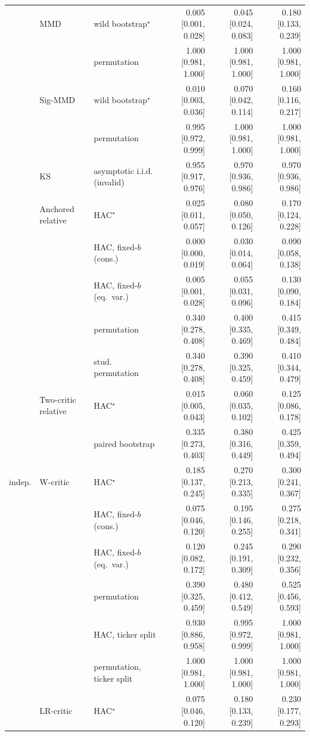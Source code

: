 \begin{tabular}{lllrrr}
 & MMD & wild bootstrap$^{\star}$ & 0.005 [0.001, 0.028] & 0.045 [0.024, 0.083] & 0.180 [0.133, 0.239] \\
 &  & permutation & 1.000 [0.981, 1.000] & 1.000 [0.981, 1.000] & 1.000 [0.981, 1.000] \\
 & Sig-MMD & wild bootstrap$^{\star}$ & 0.010 [0.003, 0.036] & 0.070 [0.042, 0.114] & 0.160 [0.116, 0.217] \\
 &  & permutation & 0.995 [0.972, 0.999] & 1.000 [0.981, 1.000] & 1.000 [0.981, 1.000] \\
 & KS & asymptotic i.i.d. (invalid) & 0.955 [0.917, 0.976] & 0.970 [0.936, 0.986] & 0.970 [0.936, 0.986] \\
 & Anchored relative & HAC$^{\star}$ & 0.025 [0.011, 0.057] & 0.080 [0.050, 0.126] & 0.170 [0.124, 0.228] \\
 &  & HAC, fixed-$b$ (cons.) & 0.000 [0.000, 0.019] & 0.030 [0.014, 0.064] & 0.090 [0.058, 0.138] \\
 &  & HAC, fixed-$b$ (eq.\ var.) & 0.005 [0.001, 0.028] & 0.055 [0.031, 0.096] & 0.130 [0.090, 0.184] \\
 &  & permutation & 0.340 [0.278, 0.408] & 0.400 [0.335, 0.469] & 0.415 [0.349, 0.484] \\
 &  & stud. permutation & 0.340 [0.278, 0.408] & 0.390 [0.325, 0.459] & 0.410 [0.344, 0.479] \\
 & Two-critic relative & HAC$^{\star}$ & 0.015 [0.005, 0.043] & 0.060 [0.035, 0.102] & 0.125 [0.086, 0.178] \\
 &  & paired bootstrap & 0.335 [0.273, 0.403] & 0.380 [0.316, 0.449] & 0.425 [0.359, 0.494] \\
indep. & W-critic & HAC$^{\star}$ & 0.185 [0.137, 0.245] & 0.270 [0.213, 0.335] & 0.300 [0.241, 0.367] \\
 &  & HAC, fixed-$b$ (cons.) & 0.075 [0.046, 0.120] & 0.195 [0.146, 0.255] & 0.275 [0.218, 0.341] \\
 &  & HAC, fixed-$b$ (eq.\ var.) & 0.120 [0.082, 0.172] & 0.245 [0.191, 0.309] & 0.290 [0.232, 0.356] \\
 &  & permutation & 0.390 [0.325, 0.459] & 0.480 [0.412, 0.549] & 0.525 [0.456, 0.593] \\
 &  & HAC, ticker split & 0.930 [0.886, 0.958] & 0.995 [0.972, 0.999] & 1.000 [0.981, 1.000] \\
 &  & permutation, ticker split & 1.000 [0.981, 1.000] & 1.000 [0.981, 1.000] & 1.000 [0.981, 1.000] \\
 & LR-critic & HAC$^{\star}$ & 0.075 [0.046, 0.120] & 0.180 [0.133, 0.239] & 0.230 [0.177, 0.293] \\

\end{tabular}
